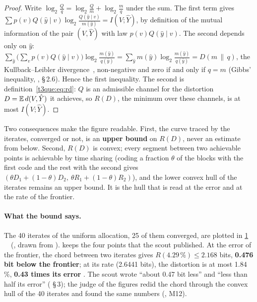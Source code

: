 \begin{proof}
Write $\log_2 \frac{Q}{q} = \log_2 \frac{Q}{m} + \log_2 \frac{m}{q}$ under the sum. The first term gives $\sum p(v) Q(\hat y\mid v) \log_2 \frac{Q(\hat y\mid v)}{m(\hat y)} = I(V ; \hat Y)$, by definition of the mutual information of the pair $(V, \hat Y)$ with law $p(v) Q(\hat y \mid v)$. The second depends only on $\hat y$: $\sum_{\hat y} \bigl(\sum_v p(v) Q(\hat y\mid v)\bigr) \log_2 \frac{m(\hat y)}{q(\hat y)} = \sum_{\hat y} m(\hat y) \log_2 \frac{m(\hat y)}{q(\hat y)} = D(m \,\|\, q)$, the Kullback--Leibler divergence~\cite{kullback1951}, non-negative and zero if and only if $q = m$ (Gibbs' inequality, \cite{cover2006}, §\,2.6). Hence the first inequality. The second is definition~\eqref{t3que:eq:rd}: $Q$ is an admissible channel for the distortion $D = \mathbb{E}\, d(V, \hat Y)$ it achieves, so $R(D)$, the minimum over these channels, is at most $I(V ; \hat Y)$.
\end{proof}

Two consequences make the figure readable. First, the curve traced by the iterates, converged or not, is an \textbf{upper bound} on $R(D)$, never an estimate from below. Second, $R(D)$ is convex; every segment between two achievable points is achievable by time sharing (coding a fraction $\theta$ of the blocks with the first code and the rest with the second gives $(\theta D_1 + (1-\theta) D_2,\ \theta R_1 + (1-\theta) R_2)$), and the lower convex hull of the iterates remains an upper bound. It is the hull that is read at the error and at the rate of the frontier.

\begin{figure}[tbp]
\centering
\GrapheEclBorne
{}
\label{fig:t3-ecl-borne}
\end{figure}

\paragraph{What the bound says.} The 40 iterates of the uniform allocation, 25 of them converged, are plotted in \cref{fig:t3-ecl-borne} \mes~\calc~(, drawn from ).  keeps the four points that the scout published. At the error of the frontier, the chord between two iterates gives $R(4.29\,\%) \le 2.168$ bits, \textbf{0.476 bit below the frontier}; at its rate (2.6441 bits), the distortion is at most 1.84\,\%, \textbf{0.43 times its error} \calc. The scout wrote ``about 0.47 bit less'' and ``less than half its error'' ( §\,3); the judge of the figures redid the chord through the convex hull of the 40 iterates and found the same numbers (, M12).

